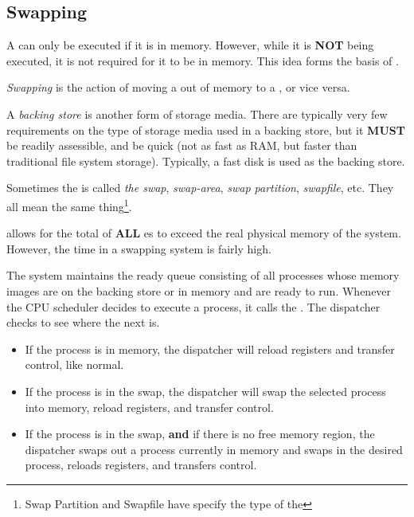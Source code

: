 \subsection{Swapping}\label{subsec:Swapping}
A  can only be executed if it is in memory.
However, while it is \textbf{NOT} being executed, it is not required for it to be in memory.
This idea forms the basis of .

\begin{definition}[Swapping]\label{def:Swapping}
  \emph{Swapping} is the action of moving a  out of memory to a , or vice versa.
\end{definition}

\begin{definition}\label{def:Backing_Store}
  A \emph{backing store} is another form of storage media.
  There are typically very few requirements on the type of storage media used in a backing store, but it \textbf{MUST} be readily assessible, and be quick (not as fast as RAM, but faster than traditional file system storage).
  Typically, a fast disk is used as the backing store.

  \begin{remark}[Swap]\label{rmk:Swap}
    Sometimes the  is called \emph{the swap}, \emph{swap-area}, \emph{swap partition}, \emph{swapfile}, etc.
    They all mean the same thing\footnote{Swap Partition and Swapfile have specify the type of the }.
  \end{remark}
\end{definition}

 allows for the total  of \textbf{ALL} es to exceed the real physical memory of the system.
However, the  time in a swapping system is fairly high.

The system maintains the ready queue consisting of all processes whose memory images are on the backing store or in memory and are ready to run.
Whenever the CPU scheduler decides to execute a process, it calls the .
The dispatcher checks to see where the next  is.
\begin{itemize}[noitemsep]
\item If the process is in memory, the dispatcher will reload registers and transfer control, like normal.
\item If the process is in the swap, the dispatcher will swap the selected process into memory, reload registers, and transfer control.
\item If the process is in the swap, \textbf{and} if there is no free memory region, the dispatcher swaps out a process currently in memory and swaps in the desired process, reloads registers, and transfers control.
\end{itemize}


